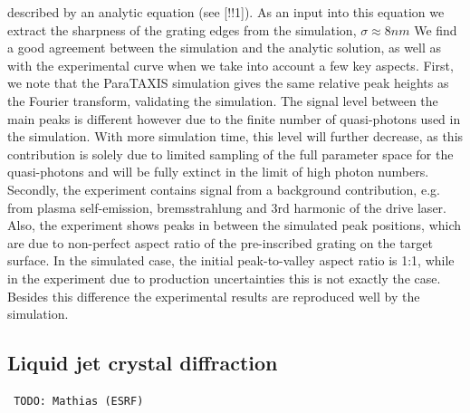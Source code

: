 \documentclass[10pt]{scrartcl}
\begin{document}
described by an analytic equation (see [!!1]).  As an input into this equation
we extract the sharpness of the grating edges from the simulation,
$\sigma\approx 8 nm$ We find a good agreement between the simulation and the
analytic solution, as well as with the experimental curve when we take into
account a few key aspects.  First, we note that the ParaTAXIS simulation gives
the same relative peak heights as the Fourier transform, validating the
simulation.  The signal level between the main peaks is different however due to
the finite number of quasi-photons used in the simulation.  With more simulation
time, this level will further decrease, as this contribution is solely due to
limited sampling of the full parameter space for the quasi-photons and will be
fully extinct in the limit of high photon numbers.  Secondly, the experiment
contains signal from a background contribution, e.g. from plasma self-emission,
bremsstrahlung and 3rd harmonic of the drive laser.  Also, the experiment shows
peaks in between the simulated peak positions, which are due to non-perfect
aspect ratio of the pre-inscribed grating on the target surface.  In the
simulated case, the initial peak-to-valley aspect ratio is 1:1, while in the
experiment due to production uncertainties this is not exactly the case.
Besides this difference the experimental results are reproduced well by the
simulation.

%
\subsection{Liquid jet crystal diffraction\label{sec:liquid_crystals}}
\begin{verbatim} TODO: Mathias (ESRF) \end{verbatim}
\end{document}
